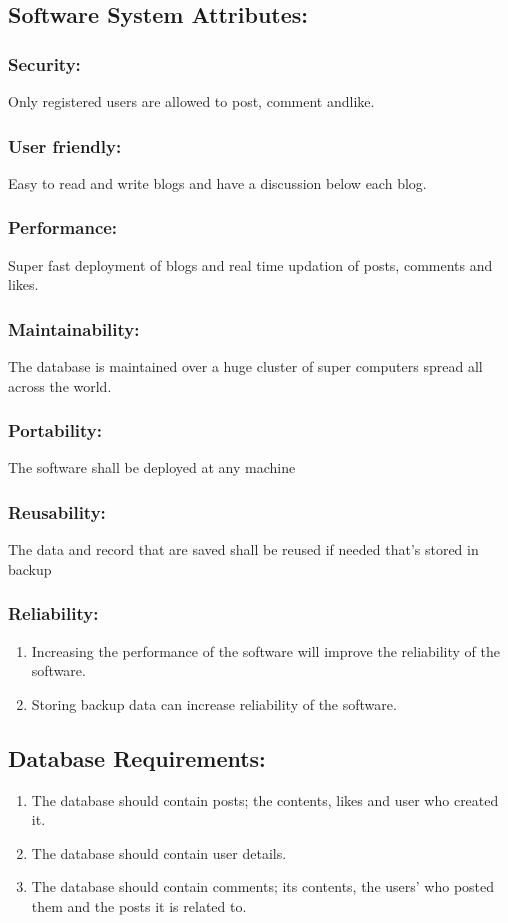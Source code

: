 \documentclass[12pt, letterpaper, twoside]{article}
\begin{document}
		\subsection{Software System Attributes: }
	
			\subsubsection{Security: } Only registered users are allowed to post, comment andlike.
			\subsubsection{User friendly: }Easy to read and write blogs and have a discussion below each blog.
			\subsubsection{Performance: }Super fast deployment of blogs and real time updation of posts, comments and likes.
			\subsubsection{Maintainability: }The database is maintained over a huge cluster of super computers spread all across the world.
			\subsubsection{Portability: }The software shall be deployed at any machine
			\subsubsection{Reusability: }The data and record that are saved shall be reused if needed that’s stored in backup
			\subsubsection{Reliability: }
\begin{enumerate}
					\item Increasing the performance of the software will improve the reliability of the software.
					\item Storing backup data can increase reliability of the software.
		\end{enumerate}
		\subsection{Database Requirements: }
		\begin{enumerate}
\item The database should contain posts; the contents, likes and user who created it.
\item The database should contain user details.
\item The database should contain comments; its contents, the users' who posted them and the posts it is related to. 
\end{enumerate}
\end{document}
